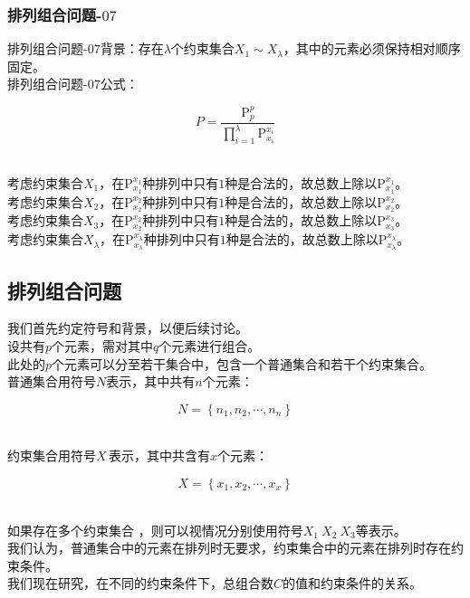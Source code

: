 \documentclass[UTF8]{ctexart}
\newcommand{\rnum}[1]{\uppercase\expandafter{\romannumeral #1\relax}}
\begin{document}
\subsubsection{排列组合问题\rnum{1}-$07$}
    排列组合问题\rnum{1}-$07$背景：存在$\lambda$个约束集合$X_1\sim X_\lambda$，其中的元素必须保持相对顺序固定。\\[3mm]
    排列组合问题\rnum{1}-$07$公式：
    \begin{large}
        \begin{equation*}
            P=\frac{\mathrm{P}_p^p}{\prod_{i=1}^{\lambda}\mathrm{P}_{x_i}^{x_i}}
        \end{equation*}
    \end{large}\\
    考虑约束集合$X_1$，在$\mathrm{P}_{x_1}^{x_1}$种排列中只有$1$种是合法的，故总数上除以$\mathrm{P}_{x_1}^{x_1}$。\\[3mm]
    考虑约束集合$X_2$，在$\mathrm{P}_{x_2}^{x_2}$种排列中只有$1$种是合法的，故总数上除以$\mathrm{P}_{x_2}^{x_2}$。\\[3mm]
    考虑约束集合$X_3$，在$\mathrm{P}_{x_2}^{x_2}$种排列中只有$1$种是合法的，故总数上除以$\mathrm{P}_{x_3}^{x_3}$。\\[3mm]
    考虑约束集合$X_\lambda$，在$\mathrm{P}_{x_\lambda}^{x_\lambda}$种排列中只有$1$种是合法的，故总数上除以$\mathrm{P}_{x_\lambda}^{x_\lambda}$。

\newpage

\subsection{排列组合问题\rnum{2}}
    我们首先约定符号和背景，以便后续讨论。\\[3mm]
    设共有$p$个元素，需对其中$q$个元素进行组合。\\[3mm]
    此处的$p$个元素可以分至若干集合中，包含一个普通集合和若干个约束集合。\\[3mm]
    普通集合用符号$N$表示，其中共有$n$个元素：
    \begin{large}
        \begin{equation*}
            N=\left\{n_1,n_2,\cdots,n_n\right\}
        \end{equation*}
    \end{large}\\
    约束集合用符号$X\,$表示，其中共含有$x$个元素：
    \begin{large}
        \begin{equation*}
            X=\left\{x_1,x_2,\cdots,x_x\right\}
        \end{equation*}
    \end{large}\\
    如果存在多个约束集合 ，则可以视情况分别使用符号$X_1~X_2~X_3$等表示。\\[3mm]
    我们认为，普通集合中的元素在排列时无要求，约束集合中的元素在排列时存在约束条件。\\[3mm]
    我们现在研究，在不同的约束条件下，总组合数$C$的值和约束条件的关系。
\end{document}
